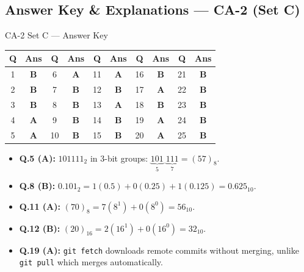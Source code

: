 

\newpage
\subsection*{Answer Key \& Explanations --- CA-2 (Set C)}

\begin{answerkeytable}{CA-2 Set C --- Answer Key}
\begin{tabular}{*{10}{c}}
\toprule
\textbf{Q} & \textbf{Ans} & \textbf{Q} & \textbf{Ans} & \textbf{Q} & \textbf{Ans} & \textbf{Q} & \textbf{Ans} & \textbf{Q} & \textbf{Ans} \\
\midrule
1 & \textbf{B} & 6 & \textbf{A} & 11 & \textbf{A} & 16 & \textbf{B} & 21 & \textbf{B} \\
2 & \textbf{B} & 7 & \textbf{B} & 12 & \textbf{B} & 17 & \textbf{A} & 22 & \textbf{B} \\
3 & \textbf{B} & 8 & \textbf{B} & 13 & \textbf{A} & 18 & \textbf{B} & 23 & \textbf{B} \\
4 & \textbf{A} & 9 & \textbf{B} & 14 & \textbf{B} & 19 & \textbf{A} & 24 & \textbf{B} \\
5 & \textbf{A} & 10 & \textbf{B} & 15 & \textbf{B} & 20 & \textbf{A} & 25 & \textbf{B} \\
\bottomrule
\end{tabular}
\end{answerkeytable}

\begin{expbox}
\begin{itemize}[leftmargin=5mm]
    \item \textbf{Q.5 (A):} $101111_2$ in 3-bit groups: $\underbrace{101}_{5}\;\underbrace{111}_{7} = (57)_8$.
    \item \textbf{Q.8 (B):} $0.101_2 = 1(0.5) + 0(0.25) + 1(0.125) = 0.625_{10}$.
    \item \textbf{Q.11 (A):} $(70)_8 = 7(8^1) + 0(8^0) = 56_{10}$.
    \item \textbf{Q.12 (B):} $(20)_{16} = 2(16^1) + 0(16^0) = 32_{10}$.
    \item \textbf{Q.19 (A):} \texttt{git fetch} downloads remote commits without merging, unlike \texttt{git pull} which merges automatically.
\end{itemize}
\end{expbox}

\newpage
